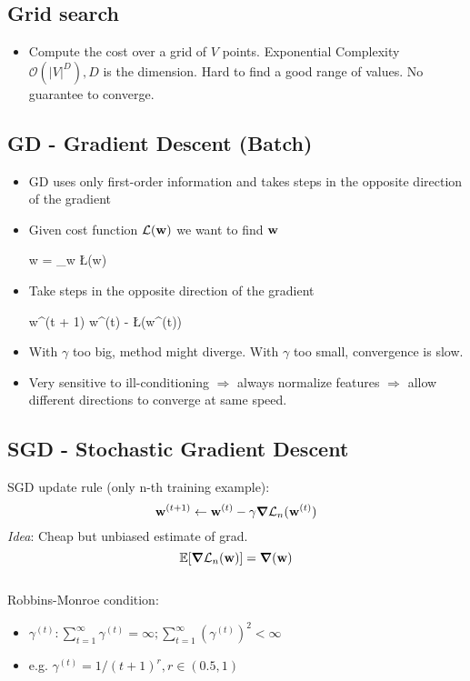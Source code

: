 \subsection{Grid search}
\begin{itemize}
    \item Compute the cost over a grid of $V$ points. Exponential Complexity $\mathcal{O}(|V|^D), D$ is the dimension. Hard to find a good range of values. No guarantee to converge.
\end{itemize}


\subsection{GD - Gradient Descent (Batch)}
\begin{itemize}
	\item GD uses only first-order information and takes steps in the opposite direction of the gradient
	\item Given cost function $\mathcal{L}(\mathbf{w})$ we want to find $\mathbf{w}$
	\begin{myalign*}
	    \*w = \arg\min_{\*w} \L(\*w)
	\end{myalign*}
    \item Take steps in the opposite direction of the gradient
   	\begin{myalign*}
	    \*w^{(t + 1)} \leftarrow \*w^{(t)} - \gamma \bm \nabla \L(\*w^{(t)})
   	\end{myalign*}

    \item With $\gamma$ too big, method might diverge. With $\gamma$ too small, convergence is slow.
    \item Very sensitive to ill-conditioning $\Rightarrow$ always normalize features $\Rightarrow$ allow different directions to converge at same speed.
\end{itemize}



\subsection{SGD - Stochastic Gradient Descent}
SGD update rule (only n-th training example):
$$ \mathbf{w}^{(t + 1)} \leftarrow \mathbf{w}^{(t)} - \gamma \bm \nabla \mathcal{L}_n(\mathbf{w}^{(t)})$$
\emph{Idea}: Cheap but unbiased estimate of grad. $$\operatorname{\mathbb{E}}[\bm\nabla\mathcal{L}_n(\mathbf{w})] = \bm \nabla(\mathbf{w})$$
\\
Robbins-Monroe condition:
\begin{itemize}
	\item $\gamma^{(t)}: \sum^{\infty}_{t=1} \gamma^{(t)} = \infty; \sum^{\infty}_{t=1} (\gamma^{(t)})^2 < \infty$
	\item e.g. $\gamma^{(t)} = 1 / (t+1)^r, r \in (0.5, 1)$
\end{itemize}

